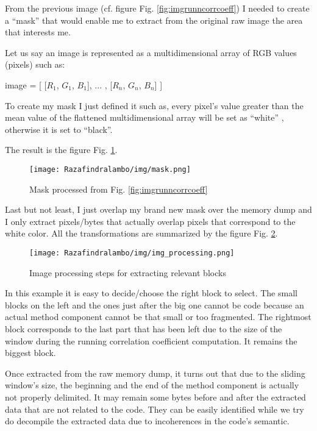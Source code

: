 From the previous image (cf. figure Fig. \ref{fig:imgrunncorrcoeff}) I needed to create a ``mask''
that would enable me to extract from the original raw image the area that
interests me.

Let us say an image is represented as a multidimensional array of RGB values (pixels) such as:
 
image = [ [$R_1$, $G_1$, $B_1$],
          ...  ,
          [$R_n$, $G_n$, $B_n$] ]
 

To create my mask I just defined it such as, every pixel's value greater than the mean value of the
flattened multidimensional array will be set as ``white'' , otherwise it is set to
``black''. 

The result is the figure Fig. \ref{fig:mask1}.
\begin{figure}[!h]
\begin{center}
    \texttt{[image: Razafindralambo/img/mask.png]}
    \caption{Mask processed from Fig. \ref{fig:imgrunncorrcoeff}}
    \label{fig:mask1}
\end{center}
\end{figure}

Last but not least, I just overlap my brand new mask over the memory dump and I only extract
pixels/bytes that actually overlap pixels that correspond to the white color. All the
transformations are summarized by the figure Fig. \ref{fig:extract1}.

\begin{figure}[!h]
\begin{center}
    \texttt{[image: Razafindralambo/img/img\_processing.png]}
    \caption{Image processing steps for extracting relevant blocks}
    \label{fig:extract1}
\end{center}
\end{figure}
In this example it is easy to decide/choose the right block to select. The small blocks on the left
and the ones  just after the big one cannot be code because an actual method component cannot be
that small or too fragmented. The rightmost block corresponds to the last part that has been left
due to the size of the window during the running correlation coefficient computation.  It remains
the biggest block. 

Once extracted from the raw memory dump, it turns out that due to the sliding window's size, the
beginning and the end of the method component is actually not properly delimited. It may remain some
bytes before and after the extracted data that are not related to the code. They can be easily
identified while we try do decompile the extracted data due to incoherences in the code's semantic.

